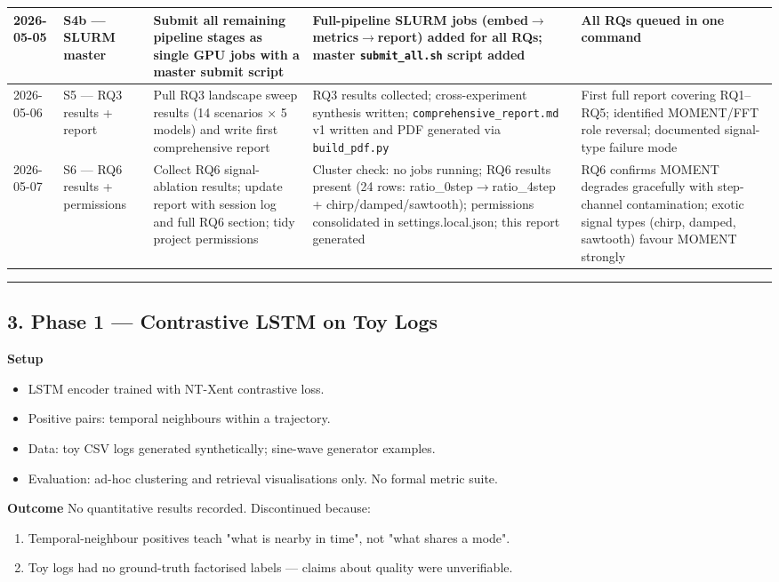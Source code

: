 \documentclass[11pt,a4paper]{article}
\begin{document}
\begin{longtable}{|l|l|l|l|l|}
\hline
2026-05-05 & S4b --- SLURM master & Submit all remaining pipeline stages as single GPU jobs with a master submit script & Full-pipeline SLURM jobs (embed$\rightarrow$metrics$\rightarrow$report) added for all RQs; master \texttt{submit\_all.sh} script added & All RQs queued in one command \\
\hline
2026-05-06 & S5 --- RQ3 results + report & Pull RQ3 landscape sweep results (14 scenarios × 5 models) and write first comprehensive report & RQ3 results collected; cross-experiment synthesis written; \texttt{comprehensive\_report.md} v1 written and PDF generated via \texttt{build\_pdf.py} & First full report covering RQ1--RQ5; identified MOMENT/FFT role reversal; documented signal-type failure mode \\
\hline
2026-05-07 & S6 --- RQ6 results + permissions & Collect RQ6 signal-ablation results; update report with session log and full RQ6 section; tidy project permissions & Cluster check: no jobs running; RQ6 results present (24 rows: ratio\_0step$\rightarrow$ratio\_4step + chirp/damped/sawtooth); permissions consolidated in settings.local.json; this report generated & RQ6 confirms MOMENT degrades gracefully with step-channel contamination; exotic signal types (chirp, damped, sawtooth) favour MOMENT strongly \\
\hline
\end{longtable}

\vspace{4pt}\hrule\vspace{4pt}

\subsection{3. Phase 1 --- Contrastive LSTM on Toy Logs}

\textbf{Setup}
\begin{itemize}
  \item LSTM encoder trained with NT-Xent contrastive loss.
  \item Positive pairs: temporal neighbours within a trajectory.
  \item Data: toy CSV logs generated synthetically; sine-wave generator examples.
  \item Evaluation: ad-hoc clustering and retrieval visualisations only. No formal metric suite.
\end{itemize}

\textbf{Outcome}
No quantitative results recorded. Discontinued because:
\begin{enumerate}
  \item Temporal-neighbour positives teach "what is nearby in time", not "what shares a mode".
  \item Toy logs had no ground-truth factorised labels --- claims about quality were unverifiable.
\end{enumerate}
\end{document}
